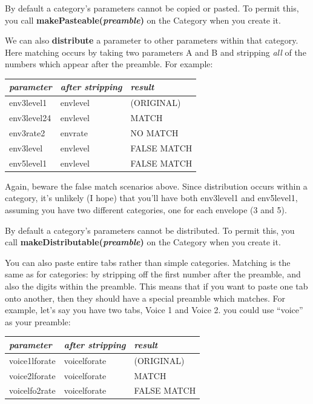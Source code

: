 \documentclass{article}
\begin{document}
By default a category's parameters cannot be copied or pasted.  To permit this, you call {\bf makePasteable(\textit{preamble})} on the Category when you create it.

We can also {\bf distribute} a parameter to other parameters within that category.  Here matching occurs by taking two parameters A and B and stripping {\it all} of the numbers which appear after the preamble.  For example:

\begin{center}
\begin{tabular}{l@{\ \ \(\longrightarrow\)\ \ }ll}
	{\it parameter} & {\it after stripping} & {\it result}\\
	\hline
	env3level1	&	envlevel & (ORIGINAL)\\
	env3level24	&	envlevel	& MATCH\\
	env3rate2		&	envrate	& NO MATCH\\
	env3level		&	envlevel		&	FALSE MATCH\\
	env5level1	&	envlevel	& FALSE MATCH	\\
\end{tabular}
\end{center}

Again, beware the false match scenarios above.  Since distribution occurs within a category, it's unlikely (I hope) that you'll have both env3level1 and env5level1, assuming you have two different categories, one for each envelope (3 and 5).

By default a category's parameters cannot be distributed.  To permit this, you call {\bf makeDistributable(\textit{preamble})} on the Category when you create it.

You can also paste entire tabs rather than simple categories. Matching is the same as for categories: by stripping off the first number after the preamble, and also the digits within the preamble.  This
means that if you want to paste one tab onto another, then
they should have a special preamble which matches.  For
example, let's say you have two tabs, Voice 1 and Voice 2.
you could use ``voice'' as your preamble:


\begin{center}
\begin{tabular}{l@{\ \ \(\longrightarrow\)\ \ }ll}
	{\it parameter} & {\it after stripping} & {\it result}\\
	\hline
	voice1lforate	&	voicelforate & (ORIGINAL)\\
	voice2lforate	&	voicelforate	& MATCH\\
	voicelfo2rate	&	voicelforate	& FALSE MATCH\\
\end{tabular}
\end{center}
\end{document}
